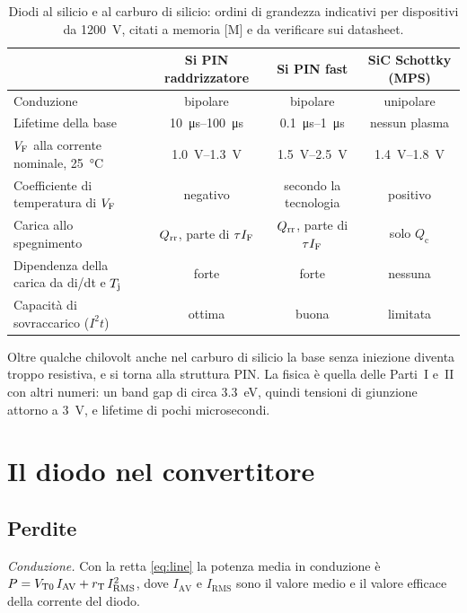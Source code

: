 \documentclass[10pt,a4paper]{scrartcl}
\let\newcommand\pdvaluedefine
\newcommand{\IF}{I_\mathrm{F}}
\newcommand{\VF}{V_\mathrm{F}}
\newcommand{\Qrr}{Q_\mathrm{rr}}
\newcommand{\VTo}{V_\mathrm{T0}}
\newcommand{\rT}{r_\mathrm{T}}
\newcommand{\Tj}{T_\mathrm{j}}
\begin{document}
\begin{table}[htb]
\centering\small
\caption{Diodi al silicio e al carburo di silicio: ordini di grandezza indicativi per dispositivi da \SI{1200}{\volt}, citati a memoria [M] e da verificare sui datasheet.}
\label{tab:sic}
\begin{tabular}{@{}lccc@{}}
\toprule
 & Si PIN raddrizzatore & Si PIN fast & SiC Schottky (MPS) \\
\midrule
Conduzione & bipolare & bipolare & unipolare \\
Lifetime della base & \SIrange{10}{100}{\micro\second} & \SIrange{0.1}{1}{\micro\second} & nessun plasma \\
$\VF$ alla corrente nominale, \SI{25}{\celsius} & \SIrange{1.0}{1.3}{\volt} & \SIrange{1.5}{2.5}{\volt} & \SIrange{1.4}{1.8}{\volt} \\
Coefficiente di temperatura di $\VF$ & negativo & secondo la tecnologia & positivo \\
Carica allo spegnimento & $\Qrr$, parte di $\tau\IF$ & $\Qrr$, parte di $\tau\IF$ & solo $Q_\mathrm{c}$ \\
Dipendenza della carica da di/dt e $\Tj$ & forte & forte & nessuna \\
Capacità di sovraccarico ($I^2t$) & ottima & buona & limitata \\
\bottomrule
\end{tabular}
\end{table}

Oltre qualche chilovolt anche nel carburo di silicio la base senza iniezione diventa troppo resistiva, e si torna alla struttura PIN. La fisica è quella delle Parti~I e~II con altri numeri: un band gap di circa \SI{3.3}{\electronvolt}, quindi tensioni di giunzione attorno a \SI{3}{\volt}, e lifetime di pochi microsecondi.

\section{Il diodo nel convertitore}
\label{sec:converter}
\subsection{Perdite}
\label{sec:losses}
\emph{Conduzione.} Con la retta \eqref{eq:line} la potenza media in conduzione è $P = \VTo\,I_\mathrm{AV} + \rT\,I_\mathrm{RMS}^2$, dove $I_\mathrm{AV}$ e $I_\mathrm{RMS}$ sono il valore medio e il valore efficace della corrente del diodo.
\end{document}

